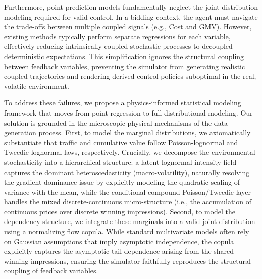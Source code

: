 \documentclass[sigconf, anonymous, review]{acmart}
\begin{document}
Furthermore, point-prediction models fundamentally neglect the joint distribution modeling required for valid control. 
In a bidding context, the agent must navigate the trade-offs between multiple coupled signals (e.g., Cost and GMV). 
However, existing methods typically perform separate regressions for each variable, effectively reducing intrinsically coupled stochastic processes to decoupled deterministic expectations.
This simplification ignores the structural coupling between feedback variables, preventing the simulator from generating realistic coupled trajectories and rendering derived control policies suboptimal in the real, volatile environment.

To address these failures, we propose a physics-informed statistical modeling framework that moves from point regression to full distributional modeling.
Our solution is grounded in the microscopic physical mechanisms of the data generation process.
First, to model the marginal distributions, we axiomatically substantiate that traffic and cumulative value follow Poisson-lognormal and Tweedie-lognormal laws, respectively.
Crucially, we decompose the environmental stochasticity into a hierarchical structure: a latent lognormal intensity field captures the dominant heteroscedasticity (macro-volatility), naturally resolving the gradient dominance issue by explicitly modeling the quadratic scaling of variance with the mean, while the conditional compound Poisson/Tweedie layer handles the mixed discrete-continuous micro-structure (i.e., the accumulation of continuous prices over discrete winning impressions).
Second, to model the dependency structure, we integrate these marginals into a valid joint distribution using a normalizing flow copula.
While standard multivariate models often rely on Gaussian assumptions that imply asymptotic independence, the copula explicitly captures the asymptotic tail dependence arising from the shared winning impressions, ensuring the simulator faithfully reproduces the structural coupling of feedback variables.
\end{document}
